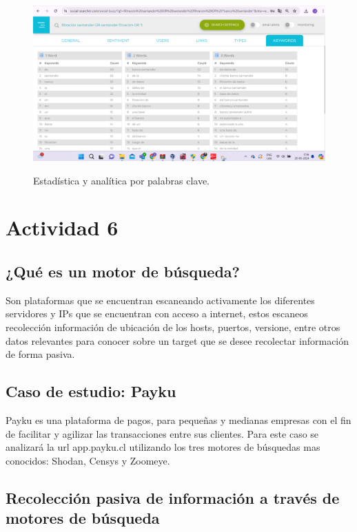 \documentclass[stu, 11pt, letterpaper, donotrepeattitle, floatsintext, natbib]{apa7}
\begin{document}
\begin{figure}[H]
\centering
\caption{Estadística y analítica por palabras clave.}
\includegraphics[width=0.75\linewidth]{osi27.png} %
\label{fig:OverallEffect}
\end{figure}

\newpage

\section{\large Actividad 6}

\subsection{¿Qué es un motor de búsqueda?} 

Son plataformas que se encuentran escaneando activamente los diferentes servidores y IPs que se encuentran con acceso a internet, estos escaneos recolección información de ubicación de los hosts, puertos, versione, entre otros datos relevantes para conocer sobre un target que se desee recolectar información de forma pasiva.

\subsection{Caso de estudio: Payku} 

Payku es una plataforma de pagos, para pequeñas y medianas empresas con el fin de facilitar y agilizar las transacciones entre sus clientes. Para este caso se analizará la url app.payku.cl utilizando los tres motores de búsquedas mas conocidos: Shodan, Censys y Zoomeye.

\subsection{Recolección pasiva de información a través de motores de búsqueda}
\end{document}
